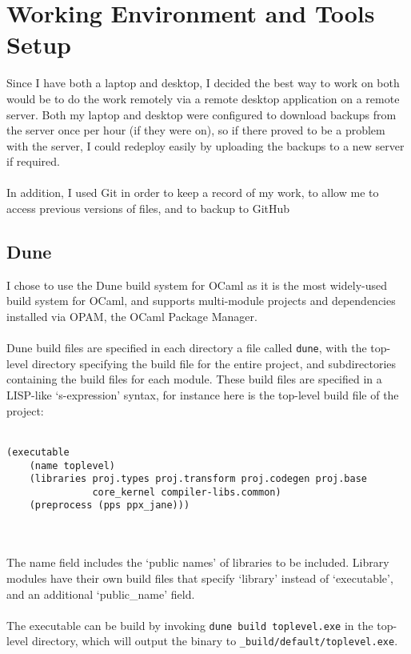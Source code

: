 \documentclass[12pt,twoside,notitlepage]{report}
\newcommand{\textinline}{\texttt}
\begin{document}
\section{Working Environment and Tools Setup}
Since I have both a laptop and desktop, I decided the best way to work on both would be to do the work remotely via a remote desktop application on a remote server. Both my laptop and desktop were configured to download backups from the server once per hour (if they were on), so if there proved to be a problem with the server, I could redeploy easily by uploading the backups to a new server if required.
\\\\
In addition, I used Git in order to keep a record of my work, to allow me to access previous versions of files, and to backup to GitHub

\subsection{Dune}
I chose to use the Dune\cite{Dune} build system for OCaml as it is the most widely-used build system for OCaml, and supports multi-module projects and dependencies installed via OPAM, the OCaml Package Manager.
\\\\
Dune build files are specified in each directory a file called \textinline{dune}, with the top-level directory specifying the build file for the entire project, and subdirectories containing the build files for each module. These build files are specified in a LISP-like `s-expression' syntax, for instance here is the top-level build file of the project:
\\\\
\begin{minipage}{\linewidth}

\begin{verbatim}
(executable
    (name toplevel)
    (libraries proj.types proj.transform proj.codegen proj.base
               core_kernel compiler-libs.common)
    (preprocess (pps ppx_jane)))
\end{verbatim}
\end{minipage}
\\\\
The name field includes the `public names' of libraries to be included. Library modules have their own build files that specify `library' instead of `executable', and an additional `public\_name' field.
\\\\
The executable can be build by invoking \textinline{dune build toplevel.exe} in the top-level directory, which will output the binary to \textinline{_build/default/toplevel.exe}.
\end{document}
